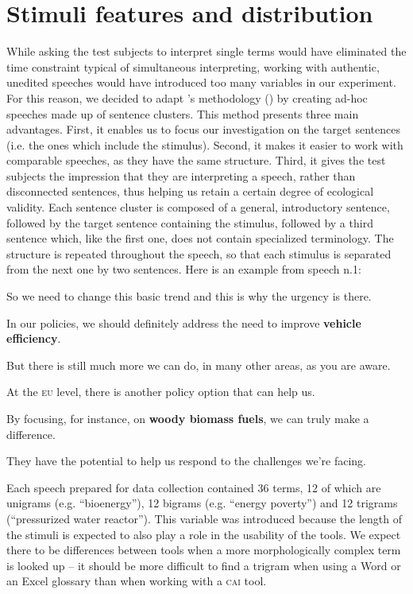 \documentclass[output=paper]{langsci/langscibook}
\begin{document}
\section{Stimuli features and distribution}\label{sec:prandi:4}
While asking the test subjects to interpret single terms would have eliminated the time constraint typical of simultaneous interpreting, working with authentic, unedited speeches would have introduced too many variables in our experiment. For this reason, we decided to adapt \citeauthor{Seeber2011a}’s methodology (\citeyear{Seeber2011a}) by creating ad-hoc speeches made up of sentence clusters. This method presents three main advantages. First, it enables us to focus our investigation on the target sentences (i.e. the ones which include the stimulus). Second, it makes it easier to work with comparable speeches, as they have the same structure. Third, it gives the test subjects the impression that they are interpreting a speech, rather than disconnected sentences, thus helping us retain a certain degree of ecological validity. Each sentence cluster is composed of a general, introductory sentence, followed by the target sentence containing the stimulus, followed by a third sentence which, like the first one, does not contain specialized terminology. The structure is repeated throughout the speech, so that each stimulus is separated from the next one by two sentences. Here is an example from speech n.1:

\ea
So we need to change this basic trend and this is why the urgency is there.

In our policies, we should definitely address the need to improve \textbf{vehicle efficiency}.

But there is still much more we can do, in many other areas, as you are aware.

At the \textsc{eu} level, there is another policy option that can help us.

By focusing, for instance, on \textbf{woody biomass fuels}, we can truly make a difference.

They have the potential to help us respond to the challenges we’re facing.
\z

Each speech prepared for data collection contained 36 terms, 12 of which are unigrams (e.g. ``bioenergy''), 12 bigrams (e.g. ``energy poverty'') and 12 trigrams (``pressurized water reactor''). This variable was introduced because the length of the stimuli is expected to also play a role in the usability of the tools. We expect there to be differences between tools when a more morphologically complex term is looked up – it should be more difficult to find a trigram when using a Word or an Excel glossary than when working with a \textsc{cai} tool. 
\end{document}
